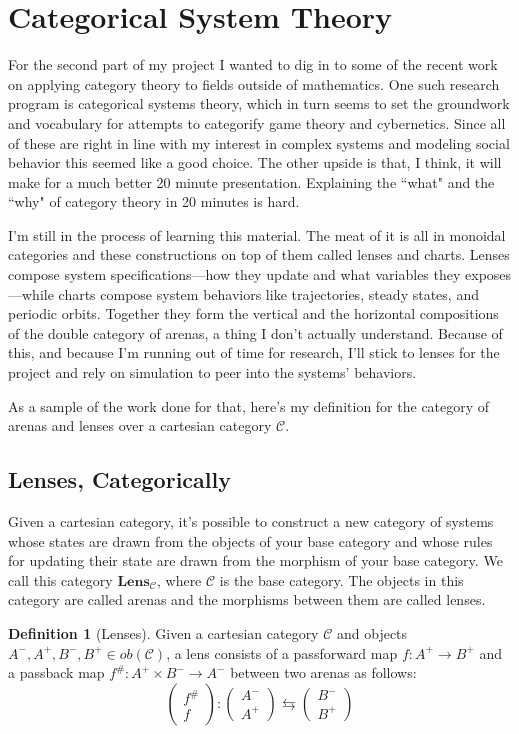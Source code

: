 \documentclass{article}
\theoremstyle{definition}
\newtheorem{definition}{Definition}
\begin{document}
\section*{Categorical System Theory}
For the second part of my project I wanted to dig in to some of the recent work on applying category theory to fields outside of mathematics.
One such research program is categorical systems theory, which in turn seems to set the groundwork and vocabulary for attempts to categorify game theory and cybernetics.
Since all of these are right in line with my interest in complex systems and modeling social behavior this seemed like a good choice.
The other upside is that, I think, it will make for a much better 20 minute presentation.
Explaining the ``what" and the ``why" of category theory in 20 minutes is hard.

I'm still in the process of learning this material.
The meat of it is all in monoidal categories and these constructions on top of them called lenses and charts.
Lenses compose system specifications---how they update and what variables they exposes---while charts compose system behaviors like trajectories, steady states, and periodic orbits.
Together they form the vertical and the horizontal compositions of the double category of arenas, a thing I don't actually understand.
Because of this, and because I'm running out of time for research, I'll stick to lenses for the project and rely on simulation to peer into the systems' behaviors.

As a sample of the work done for that, here's my definition for the category of arenas and lenses over a cartesian category $\mathcal{C}$.

\subsection*{Lenses, Categorically}
Given a cartesian category, it's possible to construct a new category of systems whose states are drawn from the objects of your base category and whose rules for updating their state are drawn from the morphism of your base category.
We call this category $\textbf{Lens}_{\mathcal{C}}$, where $\mathcal{C}$ is the base category.
The objects in this category are called arenas and the morphisms between them are called lenses.

\begin{definition}[Lenses]
    Given a cartesian category $\mathcal{C}$ and objects $A^-, A^+, B^-, B^+ \in ob(\mathcal{C})$, a lens consists of a passforward map $f:A^+\rightarrow B^+$ and a passback map $f^\#:A^+ \times B^- \rightarrow A^-$ between two arenas as follows:
    \[
        \begin{pmatrix}f^{\#}\\f\end{pmatrix}:\begin{pmatrix}A^-\\A^+\end{pmatrix}\leftrightarrows\begin{pmatrix}B^-\\B^+\end{pmatrix}
    \]
\end{definition}
\end{document}
